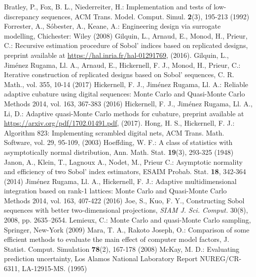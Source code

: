 \begin{thebibliography}{99}
%
%

Bratley, P., Fox, B. L., Niederreiter, H.: Implementation and tests of low-discrepancy sequences, ACM Trans. Model. Comput. Simul. \textbf{2}(3), 195-213 (1992)
Forrester, A., S\'obester, A., Keane, A.: Engineering design via surrogate modelling, Chichester: Wiley (2008)
Gilquin, L., Arnaud, E., Monod, H., Prieur, C.: Recursive estimation procedure of Sobol' indices based on replicated designs, preprint available at \url{https://hal.inria.fr/hal-01291769}, (2016).
Gilquin, L., Jim\'enez Rugama, Ll. A., Arnaud, E., Hickernell, F. J., Monod, H., Prieur, C.: Iterative construction of replicated designs based on Sobol' sequences, C. R. Math., vol. 355, 10-14 (2017)
Hickernell, F. J., Jim\'enez Rugama, Ll. A.: Reliable adaptive cubature using digital sequences: Monte Carlo and Quasi-Monte Carlo Methods 2014, vol. 163, 367-383 (2016)
Hickernell, F. J., Jim\'enez Rugama, Ll. A., Li, D.: Adaptive quasi-Monte Carlo methods for cubature, preprint available at \url{https://arxiv.org/pdf/1702.01491.pdf}, (2017).
Hong, H. S., Hickernell, F. J.: Algorithm 823: Implementing scrambled digital nets, ACM Trans. Math. Software, vol. 29, 95-109, (2003)
Hoeffding, W. F.: A class of statistics with asymptotically normal distribution, Ann. Math. Stat. \textbf{19}(3), 293-325 (1948)
Janon, A., Klein, T., Lagnoux A., Nodet, M., Prieur C.: Asymptotic normality and efficiency of two {S}obol' index estimators, ESAIM Probab. Stat. \textbf{18}, 342-364 (2014)
Jim\'enez Rugama, Ll. A., Hickernell, F. J.: Adaptive multidimensional integration based on rank-1 lattices: Monte Carlo and Quasi-Monte Carlo Methods 2014, vol. 163, 407-422 (2016)
 Joe, S., Kuo, F. Y., Constructing Sobol sequences with better two-dimensional projections, \emph{SIAM J. Sci. Comput.} 30(8), 2008, pp. 2635--2654.
Lemieux, C.: Monte Carlo and quasi-Monte Carlo sampling, Springer, New-York (2009)
Mara, T. A., Rakoto Joseph, O.: Comparison of some efficient methods to evaluate the main effect of computer model factors, J. Statist. Comput. Simulation \textbf{78}(2), 167-178 (2008)
McKay, M. D.: Evaluating prediction uncertainty, Los Alamos National Laboratory Report NUREG/CR- 6311, LA-12915-MS. (1995)

\end{thebibliography}

